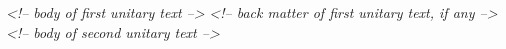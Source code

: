 \begin{shaded}
\hspace*{1em}\hspace*{1em}\hspace*{1em}\mbox{}\newline 
\textit{<!-- body of first unitary text -->}\mbox{}\newline 
\hspace*{1em}\hspace*{1em}\hspace*{1em}\mbox{}\newline 
\hspace*{1em}\hspace*{1em}\hspace*{1em}\mbox{}\newline 
\textit{<!-- back matter of first unitary text, if any -->}\mbox{}\newline 
\hspace*{1em}\hspace*{1em}\hspace*{1em}\mbox{}\newline 
\hspace*{1em}\hspace*{1em}\mbox{}\newline 
\hspace*{1em}\hspace*{1em}\mbox{}\newline 
\hspace*{1em}\hspace*{1em}\hspace*{1em}\mbox{}\newline 
\textit{<!-- body of second unitary text -->}\mbox{}\newline 
\hspace*{1em}\hspace*{1em}\hspace*{1em}\mbox{}\newline 
\hspace*{1em}\hspace*{1em}\mbox{}\newline 

\end{shaded}
